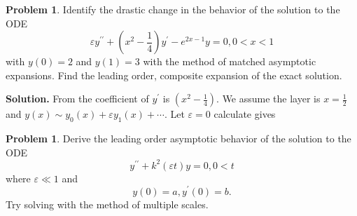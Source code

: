 \documentclass[a4paper]{book}
\newenvironment{solution}%
{\noindent\textbf{Solution.}}%
{\qedhere}
\numberwithin{equation}{chapter}
\theoremstyle{definition}
\newtheorem{pro}[exm]{Problem}
\begin{document}
\begin{pro}
  Identify the drastic change in the behavior of the solution to the ODE
  \[\varepsilon y^{\prime \prime} + \left( x^2 - \frac{1}{4} \right) y^\prime - e^{2x -1} y = 0, 0 < x < 1\]
  with $y(0) = 2$ and $y(1) = 3$ with the method of matched asymptotic expansions. Find the leading order, composite expansion of the exact solution.
\end{pro}

\begin{solution}
  From the coefficient of $y^\prime$ is $\left( x^2 - \frac{1}{4} \right)$. We assume the layer is $x = \frac{1}{2}$ and $y(x) \sim y_0(x) + \varepsilon y_1(x) + \cdots$. Let $\varepsilon = 0$ calculate gives 
\end{solution}


\begin{pro}
  Derive the leading order asymptotic behavior of the solution to the ODE
  \[y^{\prime \prime} + k^2(\varepsilon t)y = 0, 0 < t\]
  where $\varepsilon \ll 1$ and
  \[y(0) = a, y^\prime(0) = b.\]
  Try solving with the method of multiple scales.
\end{pro}
\end{document}
